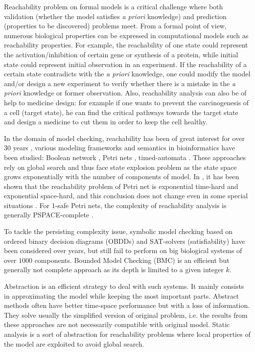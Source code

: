 \documentclass{entcs}
\begin{document}
Reachability problem on formal models is a critical challenge where both validation (whether the model satisfies \textit{a priori} knowledge) and prediction (properties to be discovered) problems meet. 
From a formal point of view, numerous biological properties can be expressed in computational models such as reachability properties. 
For example, the reachability of one state could represent the activation/inhibition of certain gene or synthesis of a protein, while initial state could represent initial observation in an experiment.
If the reachability of a certain state contradicts with the \textit{a priori} knowledge, one could modify the model and/or design a new experiment to verify whether there is a mistake in the \textit{a priori} knowledge or former observation. 
Also, reachability analysis can also be of help to medicine design: for example if one wants to prevent the carcinogenesis of a cell (target state), he can find the critical pathways towards the target state and design a medicine to cut them in order to keep the cell healthy.

In the domain of model checking, reachability has been of great interest for over 30 years \cite{clarke2008birth,clarke20142}, various modeling frameworks and semantics in bioinformatics have been studied: Boolean network \cite{akutsu2007control}, Petri nets \cite{mayr1984,esparza1998}, timed-automata \cite{Daws1998,wozna2003}. 
These approaches rely on global search and thus face state explosion problem as the state space grows exponentially with the number of components of model. 
In \cite{peterson1977petri}, it has been shown that the reachability problem of Petri net is exponential time-hard and exponential space-hard, and this conclusion does not change even in some special situations \cite{esparza1998}. 
For 1-safe Petri nets, the complexity of reachability analysis is generally PSPACE-complete \cite{cheng1995complexity}.%

To tackle the persisting complexity issue, symbolic model checking \cite{burch1992symbolic} based on ordered binary decision diagrams (OBDDs) and SAT-solvers (satisfiability) \cite{abdulla2000symbolic} have been considered over years, but still fail to perform on big biological systems of over $1000$ components. 
Bounded Model Checking (BMC) \cite{clarke2001bounded} is an efficient but generally not complete approach as its depth is limited to a given integer $k$.

Abstraction is an efficient strategy to deal with such systems. 
It mainly consists in approximating the model while keeping the most important parts.
Abstract methods often have better time-space performance but with a loss of information. 
They solve usually the simplified version of original problem, i.e. the results from these approaches are not necessarily compatible with original model.
Static analysis is a sort of abstraction for reachability problems where local properties of the model are exploited to avoid global search. 
\end{document}
